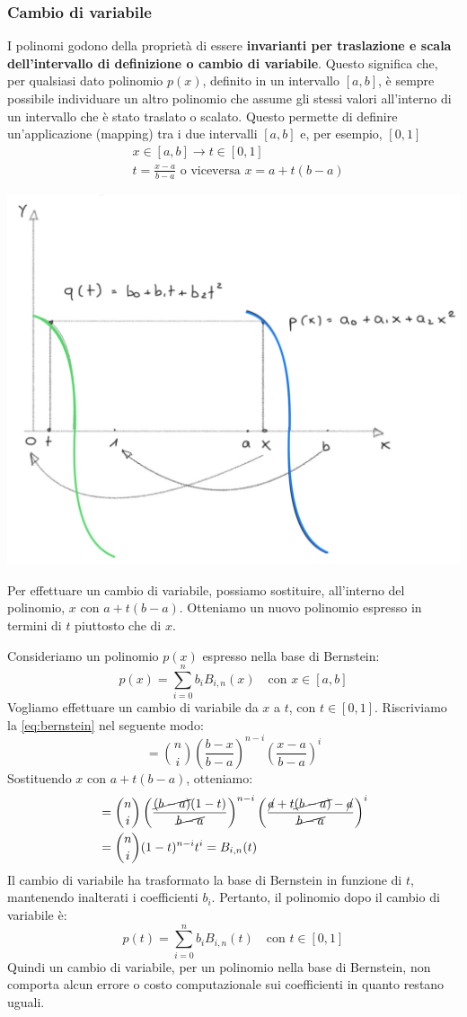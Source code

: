 \documentclass{article}
\numberwithin{equation}{section}
\begin{document}
\subsubsection{Cambio di variabile}
I polinomi godono della proprietà di essere \textbf{invarianti per traslazione e scala
dell'intervallo di definizione o cambio di variabile}. Questo significa che,
per qualsiasi dato polinomio $p(x)$, definito in un intervallo $[a,b]$, è
sempre possibile individuare un altro polinomio che assume gli stessi valori
all'interno di un intervallo che è stato traslato o scalato. Questo permette
di definire un'applicazione (mapping) tra i due intervalli $[a,b]$ e, per
esempio, $[0,1]$
\begin{equation}
   \begin{aligned}
       & x\in[a,b]\rightarrow t\in[0,1] \\ 
       & t=\frac{x-a}{b-a} \text{ o viceversa }x=a+t(b-a)
   \end{aligned} 
\end{equation}
\begin{center}
    \includegraphics[width=0.5\linewidth]{cambio_variabile}
\end{center}
Per effettuare un cambio di variabile, possiamo sostituire, all'interno del
polinomio, $x$ con $a+t(b-a)$. Otteniamo un nuovo polinomio espresso in
termini di $t$ piuttosto che di $x$. 

Consideriamo un polinomio $p(x)$ espresso nella base di Bernstein:
$$p(x)=\displaystyle\sum_{i=0}^{n}b_iB_{i,n}(x)\quad \text{con }x\in[a,b]$$
Vogliamo effettuare un cambio di variabile da $x$ a $t$, con $t\in[0,1]$.
Riscriviamo la \ref{eq:bernstein} nel seguente modo:
$$=\binom{n}{i}\left(\frac{b-x}{b-a}\right)^{n-i}\left(\frac{x-a}{b-a}\right)^i$$
Sostituendo $x$ con $a+t(b-a)$, otteniamo:
\begin{equation*}
   \begin{aligned}
       &=\binom{n}{i}\left(\frac{\cancel{(b-a)}(1-t)}{\cancel{b-a}}\right)^{n-i}\left(
       \frac{\cancel{a}+t\cancel{(b-a)}-\cancel{a}}{\cancel{b-a}}\right)^i\\ 
       &=\binom{n}{i}(1-t)^{n-i}t^i=B_{i,n}(t)
   \end{aligned} 
\end{equation*}
Il cambio di variabile ha trasformato la base di Bernstein in funzione di $t$,
mantenendo inalterati i coefficienti $b_i$. Pertanto, il polinomio dopo il
cambio di variabile è:
$$p(t)=\displaystyle\sum_{i=0}^{n}b_iB_{i,n}(t)\quad \text{con }t\in[0,1]$$
Quindi un cambio di variabile, per un polinomio nella base di Bernstein, non
comporta alcun errore o costo computazionale sui coefficienti in quanto
restano uguali.
\end{document}
